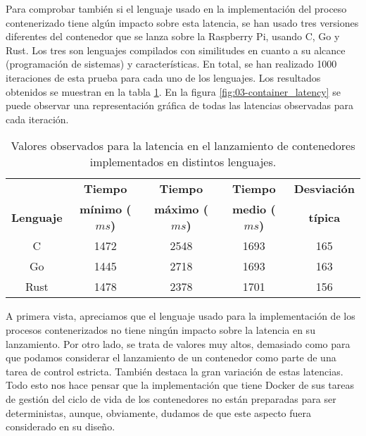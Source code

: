 Para comprobar también si el lenguaje usado en la implementación del proceso
contenerizado tiene algún impacto sobre esta latencia, se han usado tres
versiones diferentes del contenedor que se lanza sobre la Raspberry Pi, usando
C, Go y Rust. Los tres son lenguajes compilados con similitudes en cuanto a su
alcance (programación de sistemas) y características. En total, se han realizado
1000 iteraciones de esta prueba para cada uno de los lenguajes. Los resultados
obtenidos se muestran en la tabla \ref{tab:03-container_latency}. En la figura
\ref{fig:03-container_latency} se puede observar una representación gráfica de
todas las latencias observadas para cada iteración.

\begin{table}[H]
    \centering
    \begin{tabular}{ |c|c|c|c|c| }
        \hline
                          & \textbf{Tiempo}        & \textbf{Tiempo}        & \textbf{Tiempo}       & \textbf{Desviación} \\
        \textbf{Lenguaje} & \textbf{mínimo ($ms$)} & \textbf{máximo ($ms$)} & \textbf{medio ($ms$)} & \textbf{típica}     \\
        \hline
        C                 & 1472                   & 2548                   & 1693                  & 165                 \\
        \hline
        Go                & 1445                   & 2718                   & 1693                  & 163                 \\
        \hline
        Rust              & 1478                   & 2378                   & 1701                  & 156                 \\
        \hline
    \end{tabular}
    \caption{Valores observados para la latencia en el lanzamiento de
        contenedores implementados en distintos lenguajes.}
    \label{tab:03-container_latency}
\end{table}

A primera vista, apreciamos que el lenguaje usado para la implementación de los
procesos contenerizados no tiene ningún impacto sobre la latencia en su
lanzamiento. Por otro lado, se trata de valores muy altos, demasiado como para
que podamos considerar el lanzamiento de un contenedor como parte de una tarea
de control estricta. También destaca la gran variación de estas latencias. Todo esto
nos hace pensar que la implementación que tiene Docker de sus tareas de gestión
del ciclo de vida de los contenedores no están preparadas para ser
deterministas, aunque, obviamente, dudamos de que este aspecto fuera considerado
en su diseño.

